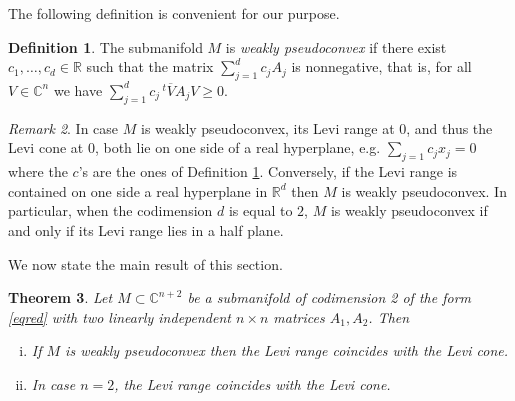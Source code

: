\documentclass[12pt]{amsart}
\newcommand{\C}{\mathbb C}
\newcommand{\R}{\mathbb R}
\newcommand{\transp}{\,^t}
\newtheorem{theo}{Theorem}[section]
\theoremstyle{remark}
\newtheorem{remark}[theo]{Remark}
\theoremstyle{example}
\theoremstyle{definition}
\newtheorem{defi}[theo]{Definition}
\numberwithin{equation}{section}
\begin{document}
The following definition is convenient for our purpose. 
\begin{defi}\label{defweak}
The submanifold $M$ is {\it weakly pseudoconvex} if there exist $c_1,\ldots,c_d\in \R$ such that the matrix $\sum_{j=1}^dc_jA_j$ is nonnegative, that is,  for all $V \in \C^n$ we have $\sum_{j=1}^dc_j\transp\overline{V}A_jV \geq 0$.   
\end{defi}
\begin{remark}\label{remlight}
In case $M$ is weakly pseudoconvex, its  Levi range at $0$, and thus the Levi cone at $0$, both lie on one side of a real hyperplane, e.g. $\sum_{j=1}c_jx_j=0$ where the $c$'s are the ones of Definition \ref{defweak}.  Conversely, if the Levi range is contained on one side a real hyperplane in $\R^d$ then  $M$ is  weakly pseudoconvex. In particular, when the codimension $d$ is equal to $2$, $M$ is  weakly pseudoconvex if and only if its Levi range lies in a half plane.   
\end{remark}

We now state the main result of this section. 

\begin{theo}\label{theorangecone}
Let $M \subset \C^{n+2}$ be a submanifold of codimension 2 of the form \eqref{eqred} with  two linearly independent $n\times n$ matrices $A_1,A_2$. Then
\begin{enumerate}[i.]
\item If $M$ is weakly pseudoconvex then the Levi range coincides with the Levi cone.
\item In case $n=2$, the Levi range  coincides with the Levi cone.
\end{enumerate}
\end{theo}
\end{document}
